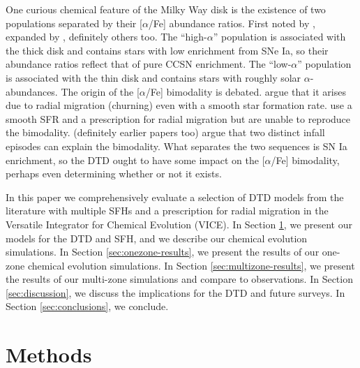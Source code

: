 \documentclass[twocolumn,twocolappendix,linenumbers]{aastex631}
\begin{document}
One curious chemical feature of the Milky Way disk is the existence of two populations separated by their [$\alpha$/Fe] abundance ratios. First noted by \citet{Furhmann1998-NearbyStars}, expanded by \citet{Hayden2015-ChemicalCartography}, definitely others too. The ``high-$\alpha$'' population is associated with the thick disk and contains stars with low enrichment from SNe Ia, so their abundance ratios reflect that of pure CCSN enrichment. The ``low-$\alpha$'' population is associated with the thin disk and contains stars with roughly solar $\alpha$-abundances.
The origin of the [$\alpha$/Fe] bimodality is debated. \citet{Schonrich2009-RadialMixing} argue that it arises due to radial migration (churning) even with a smooth star formation rate. \citet{Johnson2021-Migration} use a smooth SFR and a prescription for radial migration but are unable to reproduce the bimodality. \citet{Spitoni2021-TwoInfall} (definitely earlier papers too) argue that two distinct infall episodes can explain the bimodality. What separates the two sequences is SN Ia enrichment, so the DTD ought to have some impact on the [$\alpha$/Fe] bimodality, perhaps even determining whether or not it exists.

In this paper we comprehensively evaluate a selection of DTD models from the literature with multiple SFHs and a prescription for radial migration in the Versatile Integrator for Chemical Evolution (VICE). In Section \ref{sec:methods}, we present our models for the DTD and SFH, and we describe our chemical evolution simulations. In Section \ref{sec:onezone-results}, we present the results of our one-zone chemical evolution simulations. In Section \ref{sec:multizone-results}, we present the results of our multi-zone simulations and compare to observations. In Section \ref{sec:discussion}, we discuss the implications for the DTD and future surveys. In Section \ref{sec:conclusions}, we conclude.

\section{Methods}
\label{sec:methods}
\end{document}
